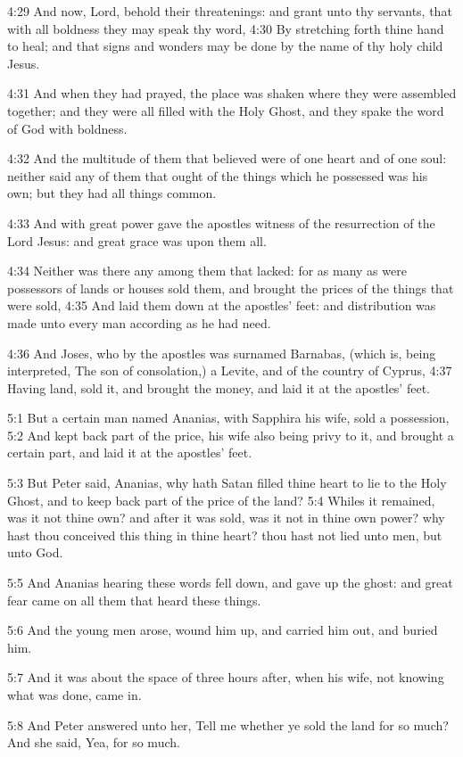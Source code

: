 4:29 And now, Lord, behold their threatenings: and grant unto thy
servants, that with all boldness they may speak thy word, 4:30 By
stretching forth thine hand to heal; and that signs and wonders may be
done by the name of thy holy child Jesus.

4:31 And when they had prayed, the place was shaken where they were
assembled together; and they were all filled with the Holy Ghost, and
they spake the word of God with boldness.

4:32 And the multitude of them that believed were of one heart and of
one soul: neither said any of them that ought of the things which he
possessed was his own; but they had all things common.

4:33 And with great power gave the apostles witness of the
resurrection of the Lord Jesus: and great grace was upon them all.

4:34 Neither was there any among them that lacked: for as many as were
possessors of lands or houses sold them, and brought the prices of the
things that were sold, 4:35 And laid them down at the apostles' feet:
and distribution was made unto every man according as he had need.

4:36 And Joses, who by the apostles was surnamed Barnabas, (which is,
being interpreted, The son of consolation,) a Levite, and of the
country of Cyprus, 4:37 Having land, sold it, and brought the money,
and laid it at the apostles' feet.

5:1 But a certain man named Ananias, with Sapphira his wife, sold a
possession, 5:2 And kept back part of the price, his wife also being
privy to it, and brought a certain part, and laid it at the apostles'
feet.

5:3 But Peter said, Ananias, why hath Satan filled thine heart to lie
to the Holy Ghost, and to keep back part of the price of the land?
5:4 Whiles it remained, was it not thine own? and after it was sold,
was it not in thine own power? why hast thou conceived this thing in
thine heart?  thou hast not lied unto men, but unto God.

5:5 And Ananias hearing these words fell down, and gave up the ghost:
and great fear came on all them that heard these things.

5:6 And the young men arose, wound him up, and carried him out, and
buried him.

5:7 And it was about the space of three hours after, when his wife,
not knowing what was done, came in.

5:8 And Peter answered unto her, Tell me whether ye sold the land for
so much? And she said, Yea, for so much.

